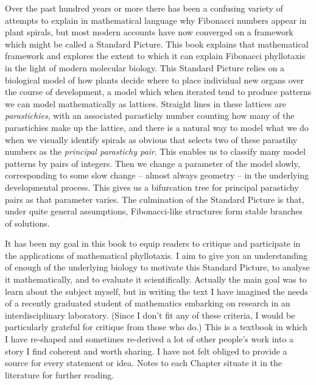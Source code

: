 

\preface


Over the past hundred years or more there has been a confusing variety of attempts to explain in mathematical language why Fibonacci numbers appear in plant spirals, but most modern accounts have now converged on a framework which might be called a Standard Picture. This book explains that mathematical framework and explores the extent to which it can explain Fibonacci phyllotaxis in the light of modern molecular biology.
 This Standard Picture relies on a biological model of how plants decide where to place individual new  organs over the course of development,
a model which when iterated tend to produce patterns we can model mathematically as lattices. Straight lines in these lattices are \textit{parastichies}, with an associated parastichy number counting how many of the parastichies make up the lattice, and there is a natural way to model what we do when we visually identify spirals as obvious that selects two of these parastihy numbers as the \textit{principal parastichy pair}.  This enables us to classify many model patterns by pairs of integers. Then we change a parameter of the model slowly, corresponding to some slow change -- almost always geometry -- in the underlying developmental process. This gives us a bifurcation tree for principal parastichy pairs as that parameter varies. The culmination of the Standard Picture is that, under quite general assumptions, Fibonacci-like structures form  stable branches of solutions.

It has been my goal in this book to equip readers to critique and participate in the applications of mathematical phyllotaxis.  I aim to give you an understanding of enough of the underlying biology to motivate this Standard Picture, to analyse it mathematically, and to evaluate it scientifically. Actually the main goal was to learn about the subject myself, but in writing the text I have imagined the needs of a recently graduated student of mathematics embarking on research in an interdisciplinary laboratory. (Since I don't fit any of these criteria, I would be particularly grateful for critique from those who do.) This is a textbook in which I have re-shaped and sometimes  re-derived a lot of other people's work into a story I find coherent and worth sharing. I have not felt obliged to provide a source for every statement or idea. Notes to each Chapter situate it in the literature for further reading. 



